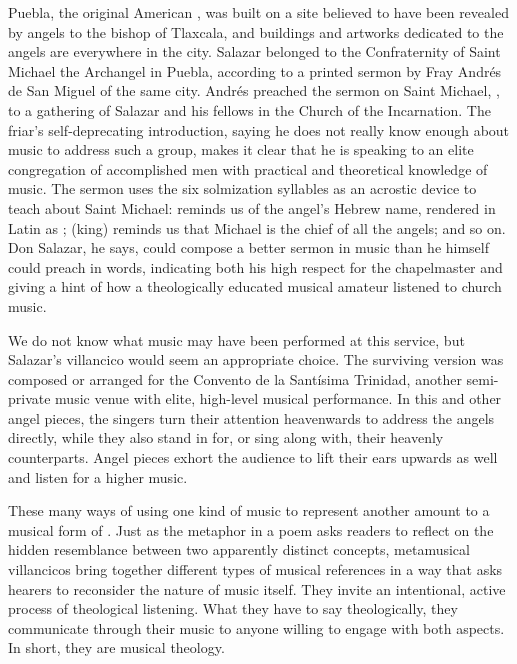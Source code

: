 Puebla, the original American , was built on a site
believed to have been revealed by angels to the bishop of Tlaxcala, and
buildings and artworks dedicated to the angels are everywhere in the city.%
    \Autocites
    {AngelContreras:Puebla}
    {Garcia-Castellanos:Puebla-Utopia}
    {Davies:HarmonyConversion}
Salazar belonged to the Confraternity of Saint Michael the Archangel in Puebla,
according to a printed sermon by Fray Andrés de San Miguel of the same city.
Andrés preached the sermon on Saint Michael, , to a gathering of Salazar and his fellows in the Church
of the Incarnation.%
    \Autocite[65--95]{SanMiguel:Sermones} %
The friar's self-deprecating introduction, saying he does not really know enough
about music to address such a group, makes it clear that he is speaking to an
elite congregation of accomplished men with practical and theoretical knowledge
of music.
The sermon uses the six solmization syllables as an acrostic device to
teach about Saint Michael:  reminds us of the angel's Hebrew name,
rendered in Latin as ;  (king) reminds us that
Michael is the chief of all the angels; and so on.
Don Salazar, he says, could compose a better sermon in music than he himself
could preach in words, indicating both his high respect for the chapelmaster
and giving a hint of how a theologically educated musical amateur listened to
church music.


We do not know what music may have been performed at this service, but
Salazar's villancico  would seem an appropriate choice.
The surviving version was composed or arranged for the Convento de la Santísima
Trinidad, another semi-private music venue with elite, high-level musical
performance.
In this and other angel pieces, the singers turn their attention heavenwards to
address the angels directly, while they also stand in for, or sing along
with, their heavenly counterparts.
Angel pieces exhort the audience to lift their ears upwards as well and listen
for a higher music.

These many ways of using one kind of music to represent another amount to a
musical form of .
Just as the metaphor in a  poem asks readers to reflect
on the hidden resemblance between two apparently distinct concepts, metamusical
villancicos bring together different types of musical references in a way that
asks hearers to reconsider the nature of music itself.
They invite an intentional, active process of theological listening.
What they have to say theologically, they communicate through their music to
anyone willing to engage with both aspects.
In short, they are musical theology.


